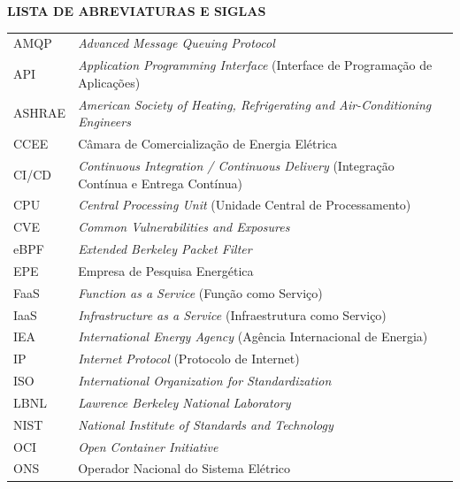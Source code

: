 \listoffigures
\newpage

\listoftables
\newpage

\begin{center}
  \textbf{LISTA DE ABREVIATURAS E SIGLAS}
\end{center}

\vspace{\baselineskip}

\noindent\small
\begin{tabular}{p{2.2cm} p{11.3cm}}
	AMQP   & \textit{Advanced Message Queuing Protocol} \\[3.5pt]
	API    & \textit{Application Programming Interface} (Interface de Programação de Aplicações) \\[3.5pt]
	ASHRAE & \textit{American Society of Heating, Refrigerating and Air-Conditioning Engineers} \\[3.5pt]
	CCEE   & Câmara de Comercialização de Energia Elétrica \\[3.5pt]
	CI/CD  & \textit{Continuous Integration / Continuous Delivery} (Integração Contínua e Entrega Contínua) \\[3.5pt]
	CPU    & \textit{Central Processing Unit} (Unidade Central de Processamento) \\[3.5pt]
	CVE    & \textit{Common Vulnerabilities and Exposures} \\[3.5pt]
	eBPF   & \textit{Extended Berkeley Packet Filter} \\[3.5pt]
	EPE    & Empresa de Pesquisa Energética \\[3.5pt]
	FaaS   & \textit{Function as a Service} (Função como Serviço) \\[3.5pt]
	IaaS   & \textit{Infrastructure as a Service} (Infraestrutura como Serviço) \\[3.5pt]
	IEA    & \textit{International Energy Agency} (Agência Internacional de Energia) \\[3.5pt]
	IP     & \textit{Internet Protocol} (Protocolo de Internet) \\[3.5pt]
	ISO    & \textit{International Organization for Standardization} \\[3.5pt]
	LBNL   & \textit{Lawrence Berkeley National Laboratory} \\[3.5pt]
	NIST   & \textit{National Institute of Standards and Technology} \\[3.5pt]
	OCI    & \textit{Open Container Initiative} \\[3.5pt]
	ONS    & Operador Nacional do Sistema Elétrico \\[3.5pt]

\end{tabular}
